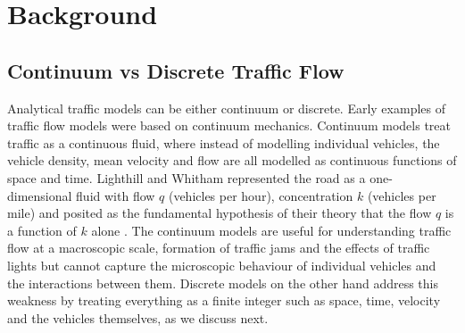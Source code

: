 \section{Background}

\subsection{Continuum vs Discrete Traffic Flow}
Analytical traffic models can be either continuum or discrete. Early examples of traffic flow models were based on continuum mechanics.
Continuum models treat traffic as a continuous fluid, where instead of modelling individual vehicles, the vehicle density, mean velocity and flow are all modelled as continuous functions of space and time. Lighthill and Whitham represented the road as a one-dimensional fluid with flow $q$ (vehicles per hour), concentration $k$ (vehicles per mile) and posited as the fundamental hypothesis of their theory that the flow $q$ is a function of $k$ alone \cite{lighthillKinematicWavesII1955}.
The continuum models are useful for understanding traffic flow at a macroscopic scale,  formation of traffic jams and the effects of traffic lights but cannot capture the microscopic behaviour of individual vehicles and the interactions between them. Discrete models on the other hand address this weakness by treating everything as a finite integer such as space, time, velocity and the vehicles themselves, as we discuss next.

